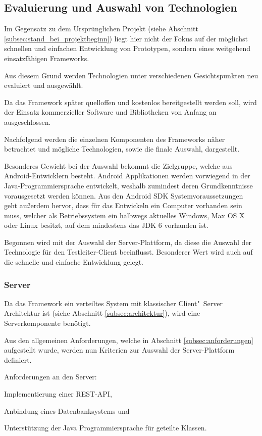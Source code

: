 \subsection{Evaluierung und Auswahl von Technologien}
Im Gegensatz zu dem Ursprünglichen Projekt (siehe Abschnitt \ref{subsec:stand_bei_projektbeginn}) liegt hier nicht der Fokus auf der möglichst schnellen und einfachen Entwicklung von Prototypen, sondern eines weitgehend einsatzfähigen Frameworks.

Aus diesem Grund werden Technologien unter verschiedenen Gesichtspunkten neu evaluiert und ausgewählt.

Da das Framework später quelloffen und kostenlos bereitgestellt werden soll, wird der Einsatz kommerzieller Software und Bibliotheken von Anfang an ausgeschlossen.

Nachfolgend werden die einzelnen Komponenten des Frameworks näher betrachtet und mögliche Technologien, sowie die finale Auswahl, dargestellt.

Besonderes Gewicht bei der Auswahl bekommt die Zielgruppe, welche aus Android-Entwicklern besteht.
Android Applikationen werden vorwiegend in der Java-Programmiersprache entwickelt, weshalb zumindest deren Grundkenntnisse vorausgesetzt werden können.
Aus den Android \ac{SDK} Systemvoraussetzungen \cite[vgl.][]{AndroidOpenSourceProject.2014c} geht außerdem hervor, dass für das Entwickeln ein Computer vorhanden sein muss, welcher als Betriebssystem ein halbwegs aktuelles Windows, Max OS X oder Linux besitzt, auf dem mindestens das \ac{JDK} 6 vorhanden ist.

Begonnen wird mit der Auswahl der Server-Plattform, da diese die Auswahl der Technologie für den Testleiter-Client beeinflusst.
Besonderer Wert wird auch auf die schnelle und einfache Entwicklung gelegt.

\subsubsection{Server}
Da das Framework ein verteiltes System mit klassischer Client"~Server Architektur ist (siehe Abschnitt \ref{subsec:architektur}), wird eine Serverkomponente benötigt.

Aus den allgemeinen Anforderungen, welche in Abschnitt \ref{subsec:anforderungen}
aufgestellt wurde, werden nun Kriterien zur Auswahl der Server-Plattform definiert.

Anforderungen an den Server:
\begin{compactitem}
	\item Implementierung einer \ac{REST}-\ac{API},
	\item Anbindung eines Datenbanksystems und
	\item Unterstützung der Java Programmiersprache für geteilte Klassen.
\end{compactitem}

